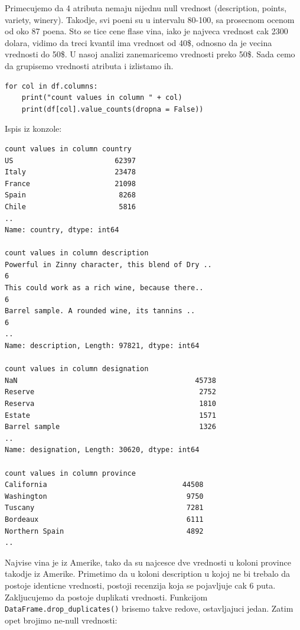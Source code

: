 \documentclass[11pt]{article} %
\begin{document}
Primecujemo da 4 atributa nemaju nijednu null vrednost (description, points, variety, winery). Takodje,
svi poeni su u intervalu 80-100, sa prosecnom ocenom od oko 87 poena. Sto se tice cene flase vina, iako je 
najveca vrednost cak 2300 dolara, vidimo da treci kvantil ima vrednost od 40\$, odnosno da je vecina vrednosti
do 50\$. U nasoj analizi zanemaricemo vrednosti preko 50\$.\newline 
Sada cemo da grupisemo vrednosti atributa i izlistamo ih.
\begin{lstlisting}
for col in df.columns:
	print("count values in column " + col)
	print(df[col].value_counts(dropna = False))
\end{lstlisting}
Ispis iz konzole:
\begin{lstlisting}
count values in column country
US                        62397
Italy                     23478
France                    21098
Spain                      8268
Chile                      5816
..
Name: country, dtype: int64

count values in column description
Powerful in Zinny character, this blend of Dry ..                                                                                    6
This could work as a rich wine, because there..                                                                                    6
Barrel sample. A rounded wine, its tannins ..                                                                                    6
..
Name: description, Length: 97821, dtype: int64

count values in column designation
NaN                                          45738
Reserve                                       2752
Reserva                                       1810
Estate                                        1571
Barrel sample                                 1326
..
Name: designation, Length: 30620, dtype: int64

count values in column province
California                                44508
Washington                                 9750
Tuscany                                    7281
Bordeaux                                   6111
Northern Spain                             4892
..
\end{lstlisting}
Najvise vina je iz Amerike, tako da su najcesce dve vrednosti u koloni province takodje iz Amerike.\newline
Primetimo da u koloni description u kojoj ne bi trebalo da postoje identicne vrednosti, postoji recenzija koja se 
pojavljuje cak 6 puta. Zakljucujemo da postoje duplikati vrednosti. Funkcijom \lstinline{DataFrame.drop_duplicates()}
brisemo takve redove, ostavljajuci jedan. Zatim opet brojimo ne-null vrednosti:
\end{document}

